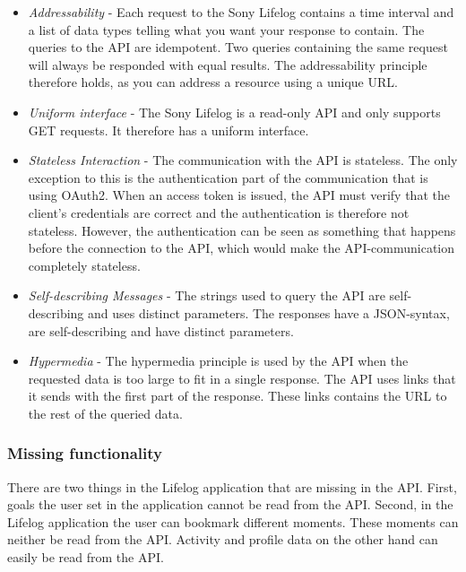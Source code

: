 \documentclass{cslthse-msc}
\begin{document}
\begin{itemize}
    \item \emph{Addressability} - Each request to the Sony Lifelog contains a time interval and a list of data types telling what you want your response to contain. The queries to the API are idempotent. Two queries containing the same request will always be responded with equal results. The addressability principle therefore holds, as you can address a resource using a unique URL. 
    \item \emph{Uniform interface} - The Sony Lifelog is a read-only API and only supports GET requests. It therefore has a uniform interface.
    \item \emph{Stateless Interaction} -  The communication with the API is stateless. The only exception to this is the authentication part of the communication that is using OAuth2. When an access token is issued, the API must verify that the client’s credentials are correct and the authentication is therefore not stateless. However, the authentication can be seen as something that happens before the connection to the API, which would make the API-communication completely stateless.
    \item \emph{Self-describing Messages} - The strings used to query the API are self-describing and uses distinct parameters. The responses have a JSON-syntax, are self-describing and have distinct parameters. 
    \item \emph{Hypermedia} - The hypermedia principle is used by the API when the requested data is too large to fit in a single response. The API uses links that it sends with the first part of the response. These links contains the URL to the rest of the queried data.

\end{itemize}
 
 
 \subsubsection{Missing functionality}
There are two things in the Lifelog application that are missing in the API. First, goals the user set in the application cannot be read from the API. Second, in the Lifelog application the user can bookmark different moments. These moments can neither be read from the API. Activity and profile data on the other hand can easily be read from the API. %
\end{document}
